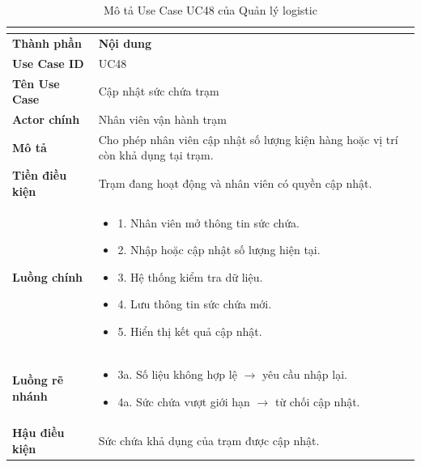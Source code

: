 \begin{longtable}{|C{3cm}|L{11cm}|}
\caption{Mô tả Use Case UC48 của Quản lý logistic}\\
\label{tab:mo-ta-uc48-quan-ly-logistic}\\
\hline
\textbf{Thành phần} & \textbf{Nội dung} \\
\hline
\textbf{Use Case ID} & UC48 \\
\hline
\textbf{Tên Use Case} & Cập nhật sức chứa trạm \\
\hline
\textbf{Actor chính} & Nhân viên vận hành trạm \\
\hline
\textbf{Mô tả} & Cho phép nhân viên cập nhật số lượng kiện hàng hoặc vị trí còn khả dụng tại trạm. \\
\hline
\textbf{Tiền điều kiện} & Trạm đang hoạt động và nhân viên có quyền cập nhật. \\
\hline
\textbf{Luồng chính} &
\begin{itemize}[leftmargin=*,topsep=2pt,itemsep=2pt]
    \item 1. Nhân viên mở thông tin sức chứa.
    \item 2. Nhập hoặc cập nhật số lượng hiện tại.
    \item 3. Hệ thống kiểm tra dữ liệu.
    \item 4. Lưu thông tin sức chứa mới.
    \item 5. Hiển thị kết quả cập nhật.
\end{itemize} \\
\hline
\textbf{Luồng rẽ nhánh} &
\begin{itemize}[leftmargin=*,topsep=2pt,itemsep=2pt]
    \item 3a. Số liệu không hợp lệ $\rightarrow$ yêu cầu nhập lại.
    \item 4a. Sức chứa vượt giới hạn $\rightarrow$ từ chối cập nhật.
\end{itemize} \\
\hline
\textbf{Hậu điều kiện} & Sức chứa khả dụng của trạm được cập nhật. \\
\hline
\end{longtable}


